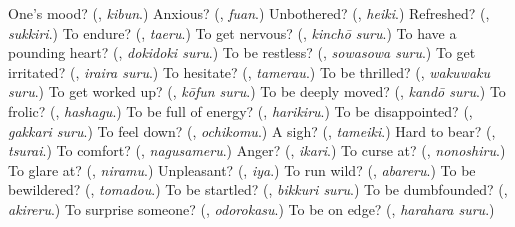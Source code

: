 \begin{tcolorbox}[breakable,colback=teal!4,colframe=teal!35!black,title={Before you move on}]
One's mood? (\textbf{}, \emph{kibun}.) Anxious? (\textbf{}, \emph{fuan}.) Unbothered? (\textbf{}, \emph{heiki}.) Refreshed? (\textbf{}, \emph{sukkiri}.) To endure? (\textbf{}, \emph{taeru}.) To get nervous? (\textbf{}, \emph{kinchō suru}.) To have a pounding heart? (\textbf{}, \emph{dokidoki suru}.) To be restless? (\textbf{}, \emph{sowasowa suru}.) To get irritated? (\textbf{}, \emph{iraira suru}.) To hesitate? (\textbf{}, \emph{tamerau}.) To be thrilled? (\textbf{}, \emph{wakuwaku suru}.) To get worked up? (\textbf{}, \emph{kōfun suru}.) To be deeply moved? (\textbf{}, \emph{kandō suru}.) To frolic? (\textbf{}, \emph{hashagu}.) To be full of energy? (\textbf{}, \emph{harikiru}.) To be disappointed? (\textbf{}, \emph{gakkari suru}.) To feel down? (\textbf{}, \emph{ochikomu}.) A sigh? (\textbf{}, \emph{tameiki}.) Hard to bear? (\textbf{}, \emph{tsurai}.) To comfort? (\textbf{}, \emph{nagusameru}.) Anger? (\textbf{}, \emph{ikari}.) To curse at? (\textbf{}, \emph{nonoshiru}.) To glare at? (\textbf{}, \emph{niramu}.) Unpleasant? (\textbf{}, \emph{iya}.) To run wild? (\textbf{}, \emph{abareru}.) To be bewildered? (\textbf{}, \emph{tomadou}.) To be startled? (\textbf{}, \emph{bikkuri suru}.) To be dumbfounded? (\textbf{}, \emph{akireru}.) To surprise someone? (\textbf{}, \emph{odorokasu}.) To be on edge? (\textbf{}, \emph{harahara suru}.)
\end{tcolorbox}
